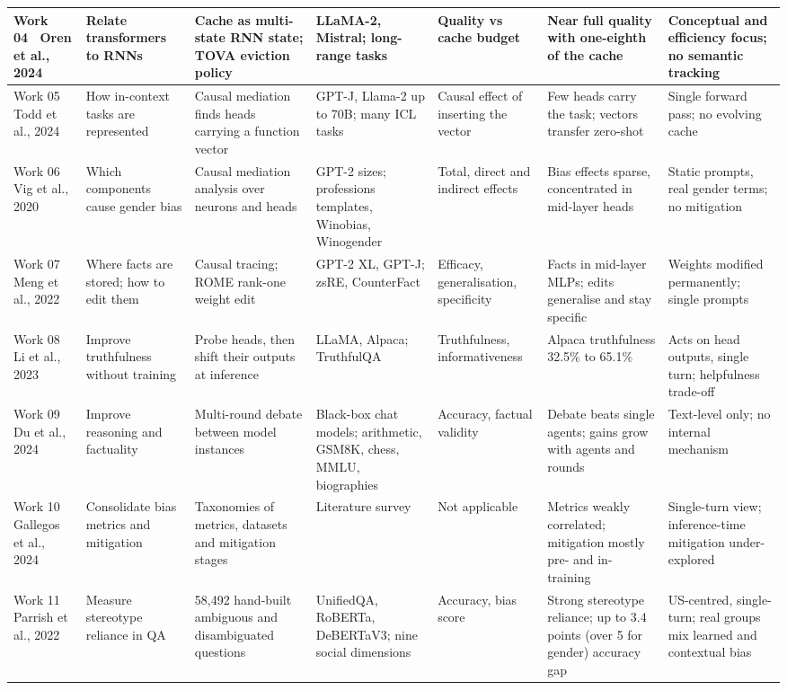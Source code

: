 \begin{landscape}
\begin{longtable}{|L{2.2cm}|L{2.6cm}|L{3.5cm}|L{2.7cm}|L{3.0cm}|L{2.9cm}|L{3.3cm}|}
Work 04~\cite{oren2024msrnn} Oren et al., 2024 & Relate transformers to RNNs & Cache as multi-state RNN state; TOVA eviction policy & LLaMA-2, Mistral; long-range tasks & Quality vs cache budget & Near full quality with one-eighth of the cache & Conceptual and efficiency focus; no semantic tracking\\\hline
Work 05~\cite{todd2024fv} Todd et al., 2024 & How in-context tasks are represented & Causal mediation finds heads carrying a function vector & GPT-J, Llama-2 up to 70B; many ICL tasks & Causal effect of inserting the vector & Few heads carry the task; vectors transfer zero-shot & Single forward pass; no evolving cache\\\hline
Work 06~\cite{vig2020causal} Vig et al., 2020 & Which components cause gender bias & Causal mediation analysis over neurons and heads & GPT-2 sizes; professions templates, Winobias, Winogender & Total, direct and indirect effects & Bias effects sparse, concentrated in mid-layer heads & Static prompts, real gender terms; no mitigation\\\hline
Work 07~\cite{meng2022rome} Meng et al., 2022 & Where facts are stored; how to edit them & Causal tracing; ROME rank-one weight edit & GPT-2 XL, GPT-J; zsRE, CounterFact & Efficacy, generalisation, specificity & Facts in mid-layer MLPs; edits generalise and stay specific & Weights modified permanently; single prompts\\\hline
Work 08~\cite{li2023iti} Li et al., 2023 & Improve truthfulness without training & Probe heads, then shift their outputs at inference & LLaMA, Alpaca; TruthfulQA & Truthfulness, informativeness & Alpaca truthfulness 32.5\% to 65.1\% & Acts on head outputs, single turn; helpfulness trade-off\\\hline
Work 09~\cite{du2024debate} Du et al., 2024 & Improve reasoning and factuality & Multi-round debate between model instances & Black-box chat models; arithmetic, GSM8K, chess, MMLU, biographies & Accuracy, factual validity & Debate beats single agents; gains grow with agents and rounds & Text-level only; no internal mechanism\\\hline
Work 10~\cite{gallegos2024bias} Gallegos et al., 2024 & Consolidate bias metrics and mitigation & Taxonomies of metrics, datasets and mitigation stages & Literature survey & Not applicable & Metrics weakly correlated; mitigation mostly pre- and in-training & Single-turn view; inference-time mitigation under-explored\\\hline
Work 11~\cite{parrish2022bbq} Parrish et al., 2022 & Measure stereotype reliance in QA & 58,492 hand-built ambiguous and disambiguated questions & UnifiedQA, RoBERTa, DeBERTaV3; nine social dimensions & Accuracy, bias score & Strong stereotype reliance; up to 3.4 points (over 5 for gender) accuracy gap & US-centred, single-turn; real groups mix learned and contextual bias\\\hline

\end{longtable}
\end{landscape}
